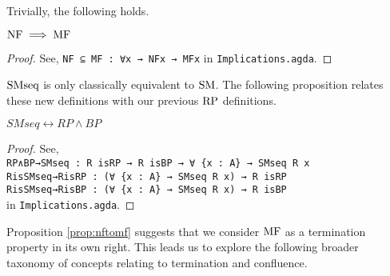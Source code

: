Trivially, the following holds.
\begin{proposition}\label{prop:nftomf}
    $\mathrm{NF} \implies \mathrm{MF}$
\end{proposition}
\begin{proof}
    See, \verb|NF ⊆ MF : ∀x → NFx → MFx| in \texttt{Implications.agda}.
\end{proof}

$\mathrm{SMseq}$ is only classically equivalent to $\mathrm{SM}$. The
following proposition relates these new definitions with our previous $\mathrm{RP}$ definitions.
\begin{proposition}\label{prop:SMRP}
    $SMseq \leftrightarrow RP \land BP$
\end{proposition}
\begin{proof}
    See,\\
    \verb|RP∧BP→SMseq : R isRP → R isBP → ∀ {x : A} → SMseq R x| \\
    \verb|RisSMseq→RisRP : (∀ {x : A} → SMseq R x) → R isRP|\\
    \verb|RisSMseq→RisBP : (∀ {x : A} → SMseq R x) → R isBP| \\
    in \texttt{Implications.agda}.
\end{proof}


Proposition \ref{prop:nftomf} suggests that we consider $\mathrm{MF}$ as a termination property in its own right. This leads us to
explore the following broader taxonomy of concepts relating to termination and confluence.

